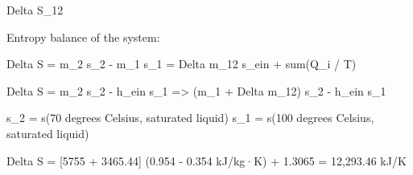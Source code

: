 Delta S_12  

Entropy balance of the system:  

Delta S = m_2 s_2 - m_1 s_1 = Delta m_12 s_ein + sum(Q_i / T)  

Delta S = m_2 s_2 - h_ein s_1 => (m_1 + Delta m_12) s_2 - h_ein s_1  

s_2 = s(70 degrees Celsius, saturated liquid)  
s_1 = s(100 degrees Celsius, saturated liquid)  

Delta S = [5755 + 3465.44] (0.954 - 0.354 kJ/kg·K) + 1.3065 = 12,293.46 kJ/K